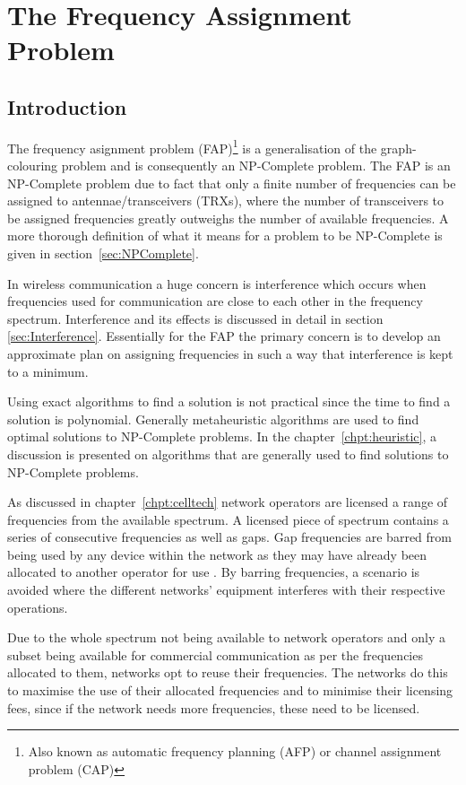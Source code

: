 \chapter{The Frequency Assignment Problem}
\label{chpt:fap}
\section{Introduction}
The frequency asignment problem (FAP)\footnote{Also known as automatic frequency planning (AFP) or channel assignment problem (CAP)\cite{ACOvsEA}} is a generalisation of the graph-colouring problem and is consequently an NP-Complete problem\cite{FAPRAMColouring}. The FAP is an NP-Complete problem due to fact that only a finite number of frequencies can be assigned to antennae/transceivers (TRXs), where the number of transceivers to be assigned frequencies greatly outweighs the number of available frequencies\cite{FAPRAMColouring}. A more thorough definition of what it means for a problem to be NP-Complete is given in section~\ref{sec:NPComplete}.

In wireless communication a huge concern is interference which occurs when frequencies used for communication are close to each other in the frequency spectrum\cite{Karen2004}. Interference and its effects is discussed in detail in section \ref{sec:Interference}. Essentially for the FAP the primary concern is to develop an approximate plan on assigning frequencies in such a way that interference is kept to a minimum. 

Using exact algorithms to find a solution is not practical since the time to find a solution is polynomial. Generally metaheuristic algorithms are used to find optimal solutions to NP-Complete problems\cite{ACOvsEA}. In the chapter~\ref{chpt:heuristic}, a discussion is presented on algorithms that are generally used to find solutions to NP-Complete problems. 

As discussed in chapter~\ref{chpt:celltech} network operators are licensed a range of frequencies from the available spectrum. A licensed piece of spectrum contains a series of consecutive frequencies as well as gaps. Gap frequencies are barred from being used by any device within the network as they may have already been allocated to another operator for use \cite{FAPInCell}. By barring frequencies, a scenario is avoided where the different networks' equipment interferes with their respective operations\cite{FAPInCell}.

Due to the whole spectrum not being available to network operators and only a subset being available for commercial communication as per the frequencies allocated to them, networks opt to reuse their frequencies\cite{FAPInCell}. The networks do this to maximise the use of their allocated frequencies and to minimise their licensing fees, since if the network needs more frequencies, these need to be licensed\cite{FAPRAMColouring}.


